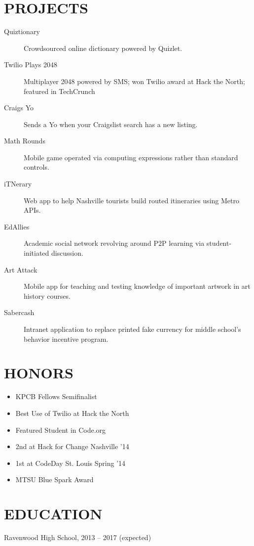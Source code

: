 \documentclass{res}
\begin{document}
\section{PROJECTS}

\begin{description}
  \item[Quiztionary] Crowdsourced online dictionary powered by Quizlet.
  \item[Twilio Plays 2048] Multiplayer 2048 powered by SMS; won Twilio award at Hack the North; featured in TechCrunch
  \item[Craigs Yo] Sends a Yo when your Craigslist search has a new listing.
  \item[Math Rounds] Mobile game operated via computing expressions rather than standard controls.
  \item[iTNerary] Web app to help Nashville tourists build routed itineraries using Metro APIs.
  \item[EdAllies] Academic social network revolving around P2P learning via student-initiated discussion.
  \item[Art Attack] Mobile app for teaching and testing knowledge of important artwork in art history courses.
  \item[Sabercash] Intranet application to replace printed fake currency for middle school's behavior incentive program.
\end{description}

\section{HONORS}

\begin{itemize}[leftmargin=8pt]
  \item KPCB Fellows Semifinalist
  \item Best Use of Twilio at Hack the North
  \item Featured Student in Code.org
  \item 2nd at Hack for Change Nashville '14
  \item 1st at CodeDay St. Louis Spring '14
  \item MTSU Blue Spark Award
\end{itemize}

\section{EDUCATION}

Ravenwood High School, 2013 -- 2017 {(expected)}
\end{document}
